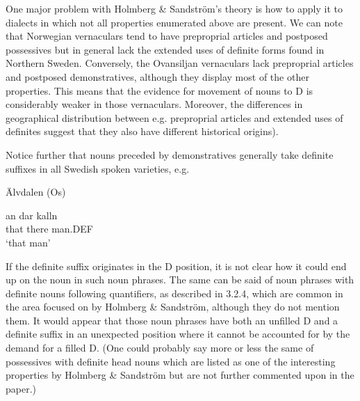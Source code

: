 
One major problem with Holmberg \& Sandström’s theory is how to apply it to dialects in which not all properties enumerated above are present. We can note that Norwegian vernaculars tend to have preproprial articles and postposed possessives but in general lack the extended uses of definite forms found in Northern Sweden. Conversely, the Ovansiljan vernaculars lack preproprial articles and postposed demonstratives, although they display most of the other properties. This means that the evidence for movement of nouns to D is considerably weaker in those vernaculars. Moreover, the differences in geographical distribution between e.g. preproprial articles and extended uses of definites suggest that they also have different historical origins). 


Notice further that nouns preceded by demonstratives generally take definite suffixes in all Swedish spoken varieties, e.g.


\item 

Älvdalen (Os)



 \ea\label{}
\gll an  dar  kalln\\


that  there  man.DEF\\

\glt ‘that man’

\z

If the definite suffix originates in the D position, it is not clear how it could end up on the noun in such noun phrases. The same can be said of noun phrases with definite nouns following quantifiers, as described in 3.2.4, which are common in the area focused on by Holmberg \& Sandström, although they do not mention them. It would appear that those noun phrases have both an unfilled D and a definite suffix in an unexpected position where it cannot be accounted for by the demand for a filled D. (One could probably say more or less the same of possessives with definite head nouns which are listed as one of the interesting properties by Holmberg \& Sandström but are not further commented upon in the paper.)

